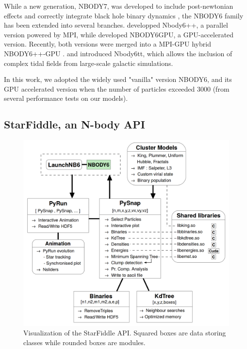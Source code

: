 While a new generation, NBODY7, was developed to include post-newtonian effects and correctly integrate black hole binary dynamics \citep{Aarseth2003b}, the NBODY6 family has been extended into several branches. \cite{Spurzem1999} developped Nbody6++, a parallel version powered by MPI, while \citep{Nitadori2012} developed NBODY6GPU, a GPU-accelerated version. Recently, both versions were merged into a MPI-GPU hybrid NBODY6++-GPU \citep{Wang2015}. \cite{Renaud2011} and \cite{Renaud2015} introduced Nbody6tt, which allows the inclusion of complex tidal fields from large-scale galactic simulations.

In this work, we adopted the widely used "vanilla" version NBODY6, and its GPU accelerated version when the number of particles exceeded 3000 (from several performance tests on our models).



\subsection{StarFiddle, an N-body API}



\begin{figure}
\center
\includegraphics[width=\linewidth]{Figures/0_StarFiddle}
\caption{Visualization of the StarFiddle API. Squared boxes are data storing classes while rounded boxes are modules.}
\label{Fig:0_StarFiddle}
\end{figure}


